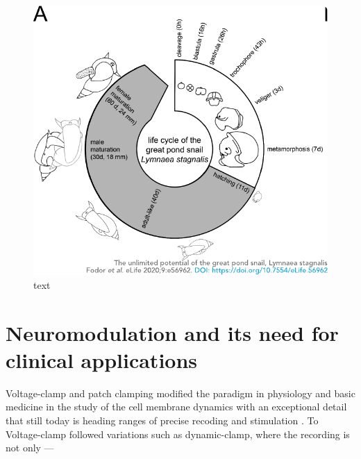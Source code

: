 \begin{figure}[htb!]
	\includegraphics[width=\textwidth]{img/intro/lymnaea_life_cycle.pdf}
	\caption{text}
	\label{fig:lymnaea_life_cycle}
\end{figure}




\section{Neuromodulation and its need for clinical applications}


Voltage-clamp and patch clamping modified the paradigm in physiology and basic medicine in the study of the cell membrane dynamics with an exceptional detail that still today is heading ranges of precise recoding and stimulation\parencite{Hamil1981} . To Voltage-clamp followed variations such as dynamic-clamp, where the recording is not only ---
